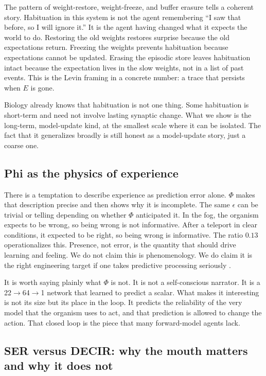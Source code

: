 \documentclass[11pt,a4paper]{article}
\begin{document}
The pattern of weight-restore, weight-freeze, and buffer erasure tells a coherent story. Habituation in this system is not the agent remembering ``I saw that before, so I will ignore it.'' It is the agent having changed what it expects the world to do. Restoring the old weights restores surprise because the old expectations return. Freezing the weights prevents habituation because expectations cannot be updated. Erasing the episodic store leaves habituation intact because the expectation lives in the slow weights, not in a list of past events. This is the Levin framing in a concrete number: a trace that persists when $E$ is gone.

Biology already knows that habituation is not one thing. Some habituation is short-term and need not involve lasting synaptic change. What we show is the long-term, model-update kind, at the smallest scale where it can be isolated. The fact that it generalizes broadly is still honest as a model-update story, just a coarse one.

\subsection{Phi as the physics of experience}

There is a temptation to describe experience as prediction error alone. $\Phi$ makes that description precise and then shows why it is incomplete. The same $\epsilon$ can be trivial or telling depending on whether $\Phi$ anticipated it. In the fog, the organism expects to be wrong, so being wrong is not informative. After a teleport in clear conditions, it expected to be right, so being wrong is informative. The ratio $0.13$ operationalizes this. Presence, not error, is the quantity that should drive learning and feeling. We do not claim this is phenomenology. We do claim it is the right engineering target if one takes predictive processing seriously \cite{friston2010, laukkonen2025}.

It is worth saying plainly what $\Phi$ is not. It is not a self-conscious narrator. It is a 22$\rightarrow$64$\rightarrow$1 network that learned to predict a scalar. What makes it interesting is not its size but its place in the loop. It predicts the reliability of the very model that the organism uses to act, and that prediction is allowed to change the action. That closed loop is the piece that many forward-model agents lack.

\subsection{SER versus DECIR: why the mouth matters and why it does not}
\end{document}
